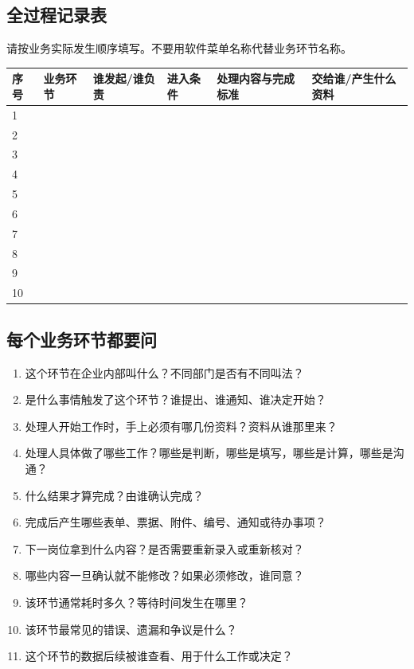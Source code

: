 \documentclass[UTF8,a4paper,11pt]{ctexart}
\begin{document}
\subsection{全过程记录表}
请按业务实际发生顺序填写。不要用软件菜单名称代替业务环节名称。
\begin{longtable}{p{}p{}p{}p{}p{}p{}}
\toprule
序号 & 业务环节 & 谁发起/谁负责 & 进入条件 & 处理内容与完成标准 & 交给谁/产生什么资料 \\
\midrule
1 & & & & & \\
2 & & & & & \\
3 & & & & & \\
4 & & & & & \\
5 & & & & & \\
6 & & & & & \\
7 & & & & & \\
8 & & & & & \\
9 & & & & & \\
10 & & & & & \\
\bottomrule
\end{longtable}

\subsection{每个业务环节都要问}
\begin{enumerate}
  \item 这个环节在企业内部叫什么？不同部门是否有不同叫法？
  \item 是什么事情触发了这个环节？谁提出、谁通知、谁决定开始？
  \item 处理人开始工作时，手上必须有哪几份资料？资料从谁那里来？
  \item 处理人具体做了哪些工作？哪些是判断，哪些是填写，哪些是计算，哪些是沟通？
  \item 什么结果才算完成？由谁确认完成？
  \item 完成后产生哪些表单、票据、附件、编号、通知或待办事项？
  \item 下一岗位拿到什么内容？是否需要重新录入或重新核对？
  \item 哪些内容一旦确认就不能修改？如果必须修改，谁同意？
  \item 该环节通常耗时多久？等待时间发生在哪里？
  \item 该环节最常见的错误、遗漏和争议是什么？
  \item 这个环节的数据后续被谁查看、用于什么工作或决定？
\end{enumerate}
\end{document}
